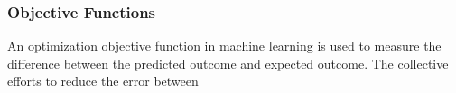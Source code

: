 \subsubsection{Objective Functions}
An optimization objective function in machine learning is used to measure the difference between the predicted outcome and expected outcome. The collective efforts to reduce the error between 